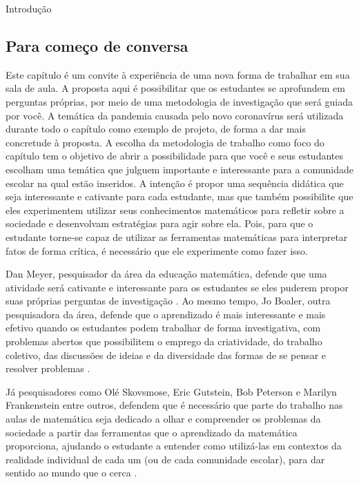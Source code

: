 \begin{apresentacao}{Introdução}
\subsection{Para começo de conversa}

Este capítulo é um convite à experiência de uma nova forma de trabalhar em sua sala de aula. A proposta aqui é possibilitar que os estudantes se aprofundem em perguntas próprias, por meio de uma metodologia de investigação que será guiada por você. A temática da pandemia causada pelo novo coronavírus será utilizada durante todo o capítulo como exemplo de projeto, de forma a dar mais concretude à proposta. A escolha da metodologia de trabalho como foco do capítulo tem o objetivo de abrir a possibilidade para que você e seus estudantes escolham uma temática que julguem importante e interessante para a comunidade escolar na qual estão inseridos. A intenção é propor uma sequência didática que seja interessante e cativante para cada estudante, mas que também possibilite que eles experimentem utilizar seus conhecimentos matemáticos para refletir sobre a sociedade e desenvolvam estratégias para agir sobre ela. Pois, para que o estudante torne-se capaz de utilizar as ferramentas matemáticas para interpretar fatos de forma crítica, é necessário que ele experimente como fazer isso. 

Dan Meyer, pesquisador da área da educação matemática, defende que uma atividade será cativante e interessante para os estudantes se eles puderem propor suas próprias perguntas de investigação \citep{meyer2011}. Ao mesmo tempo, Jo Boaler, outra pesquisadora da área, defende que o aprendizado é mais interessante e mais efetivo quando os estudantes podem trabalhar de forma investigativa, com problemas abertos que possibilitem o emprego da criatividade, do trabalho coletivo, das discussões de ideias e da diversidade das formas de se pensar e resolver problemas \citep{boaler2018}.

Já pesquisadores como Olé Skovsmose, Eric Gutstein, Bob Peterson e Marilyn Frankenstein entre outros, defendem que é necessário que parte do trabalho nas aulas de matemática seja dedicado a olhar e compreender os problemas da sociedade a partir das ferramentas que o aprendizado da matemática proporciona, ajudando o estudante a entender como utilizá-las em contextos da realidade individual de cada um (ou de cada comunidade escolar), para dar sentido ao mundo que o cerca \citep{skovsmose2014,gutstein2013,frankenstein2014}.


\end{apresentacao}

